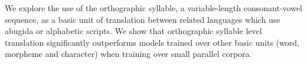 We explore the use of the orthographic syllable, a variable-length consonant-vowel sequence, as a basic unit of translation between related languages  which use abugida or alphabetic scripts. We show that orthographic syllable level translation significantly outperforms models trained over other basic units (word, morpheme and character) when training over small parallel corpora.
